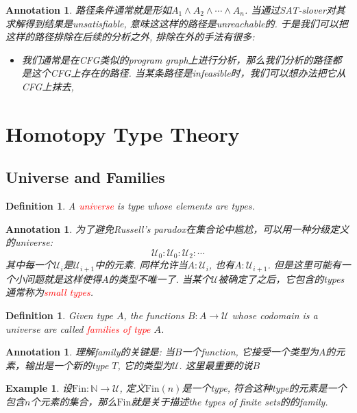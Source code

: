 \documentclass{article}
\newtheorem{example}[theorem]{Example}
\newtheorem{definition}[theorem]{Definition}
\newtheorem{annotation}[theorem]{Annotation}
\newcommand{\redt}[1]{\textcolor{red}{#1}}
\begin{document}
\begin{annotation}
\rm 路径条件通常就是形如$A_1 \wedge A_2 \wedge \cdots \wedge A_n$. 当通过SAT-slover对其求解得到结果是unsatisfiable, 意味这这样的路径是unreachable的. 于是我们可以把这样的路径排除在后续的分析之外, 排除在外的手法有很多:
\begin{itemize}
	\item 我们通常是在CFG类似的program graph上进行分析，那么我们分析的路径都是这个CFG上存在的路径. 当某条路径是infeasible时，我们可以想办法把它从CFG上抹去, 
\end{itemize}
\end{annotation}

\newpage
\section{Homotopy Type Theory}

\subsection{Universe and Families}

\begin{definition}
\rm A \redt{universe} is type whose elements are types.
\end{definition}

\begin{annotation}
\rm 为了避免Russell's paradox在集合论中尴尬，可以用一种分级定义的universe:
\[
	\mathcal{U}_0 : \mathcal{U}_0 :\mathcal{U}_2 : \cdots
\]
其中每一个$\mathcal{U}_i$是$\mathcal{U}_{i+1}$中的元素. 同样允许当$A:\mathcal{U}_i$, 也有$A : \mathcal{U}_{i+1}$. 但是这里可能有一个小问题就是这样使得$A$的类型不唯一了. 当某个$\mathcal{U}$被确定了之后，它包含的types通常称为\redt{small types}.
\end{annotation}

\begin{definition}
\rm Given type $A$, the functions $B: A \to \mathcal{U}$ whose codomain is a universe are called \redt{families of type} $A$.
\end{definition}

\begin{annotation}
\rm 理解family的关键是: 当$B$一个function, 它接受一个类型为$A$的元素，输出是一个新的type $T$, 它的类型为$\mathcal{U}$. 这里最重要的说$B$   
\end{annotation}

\begin{example}\label{ex:family_fin}
\rm 设$\text{Fin}:\mathbb{N} \to \mathcal{U}$, 定义$\text{Fin}(n)$是一个type, 符合这种type的元素是一个包含$n$个元素的集合，那么$\text{Fin}$就是关于描述the types of finite sets的的family.
\end{example}
\end{document}
